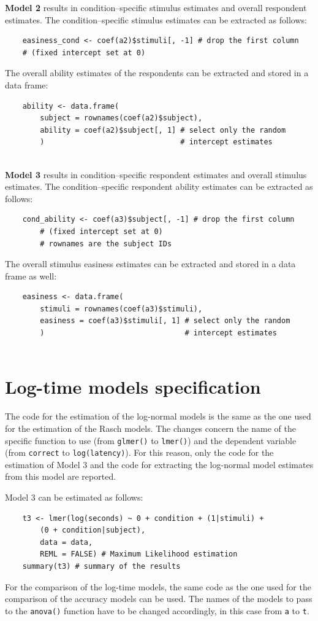 \documentclass[12pt]{book}
\begin{document}
\textbf{Model 2} results in condition--specific stimulus estimates and overall respondent estimates. 
The condition--specific stimulus estimates can be extracted as follows: 
%
\begin{lstlisting}
	easiness_cond <- coef(a2)$stimuli[, -1] # drop the first column 
	# (fixed intercept set at 0)
\end{lstlisting}
The overall ability estimates of the respondents can be extracted and stored in a data frame: 
%
\begin{lstlisting}
	ability <- data.frame(
		subject = rownames(coef(a2)$subject),
		ability = coef(a2)$subject[, 1] # select only the random 
		)                               # intercept estimates
	
\end{lstlisting}

\textbf{Model 3} results in condition--specific respondent estimates and overall stimulus estimates. The condition--specific respondent ability estimates can be extracted as follows: 
%
\begin{lstlisting}
	cond_ability <- coef(a3)$subject[, -1] # drop the first column 
		# (fixed intercept set at 0)
		# rownames are the subject IDs
\end{lstlisting}

The overall stimulus easiness estimates can be extracted and stored in a data frame as well: 
%
\begin{lstlisting}
	easiness <- data.frame(
		stimuli = rownames(coef(a3)$stimuli),
		easiness = coef(a3)$stimuli[, 1] # select only the random 
		)                                # intercept estimates
	
\end{lstlisting}

\section{Log-time models specification}

The code for the estimation of the log-normal models is the same as the one used for the estimation of the Rasch models. The changes concern the name of the specific function to use (from \texttt{glmer()} to \texttt{lmer()}) and the dependent variable (from \texttt{correct} to \texttt{log(latency)}). 
For this reason, only the code for the estimation of Model 3 and the code for extracting the log-normal model estimates from this model are reported.

Model 3 can be estimated as follows: 
%
\begin{lstlisting}
	t3 <- lmer(log(seconds) ~ 0 + condition + (1|stimuli) + 
		(0 + condition|subject),
		data = data,
		REML = FALSE) # Maximum Likelihood estimation
	summary(t3) # summary of the results
\end{lstlisting}
%
For the comparison of the log-time models, the same code as the one used for the comparison of the accuracy models can be used. 
The names of the models to pass to the \texttt{anova()} function have to be changed accordingly, in this case from \texttt{a} to \texttt{t}.
\end{document}
